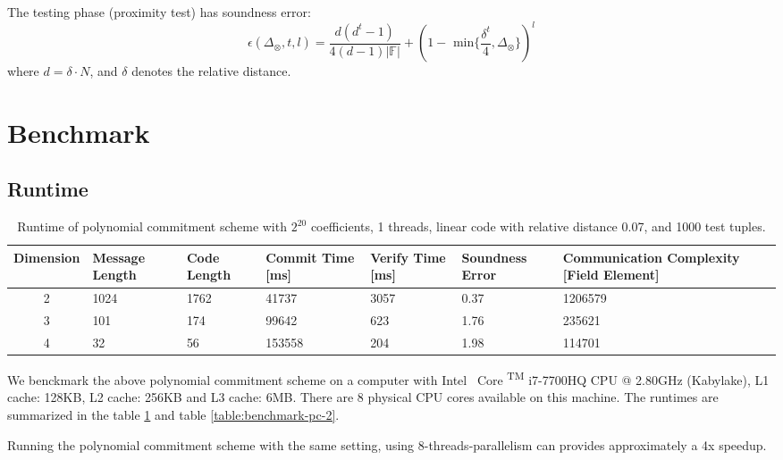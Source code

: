 \begin{lemma}
\label{lemma:pc-soundness}
The testing phase (proximity test) has soundness error:
$$
    \epsilon(\Delta_\otimes, t, l) = \frac{d(d^t-1)}{4(d-1)|\mathbb{F}|} + (1 - \text{ min}\{\frac{\delta^t}{4}, \Delta_\otimes \})^l
$$
where $d = \delta \cdot N$, and $\delta$ denotes the relative distance.
\end{lemma}






\section{Benchmark}

\subsection{Runtime}


\begin{table}[h!]
\centering
\begin{tabular}{| c | m{4em}  | m{3em}  | m{3.5em} | m{2.5em} | m{5em} | m{7em} |} 
 \hline
 Dimension & Message Length & Code Length & Commit Time [ms] & Verify Time [ms] & Soundness Error & Communication Complexity [Field Element] \\ [0.5ex] 
 \hline\hline
 2 & 1024   & 1762 & 41737  & 3057  & 0.37 & 1206579 \\
 \hline
 3 & 101    & 174 & 99642  & 623  & 1.76 & 235621  \\
 \hline
 4 & 32     & 56 & 153558  & 204  & 1.98 & 114701   \\
 \hline
\end{tabular}
\caption{Runtime of polynomial commitment scheme with $2^{20}$ coefficients, 1 threads, linear code with relative distance 0.07, and 1000 test tuples.}
\label{table:benchmark-pc-1}
\end{table}


We benckmark the above polynomial commitment scheme on a computer with
Intel \textregistered \, Core  \textsuperscript{TM} i7-7700HQ CPU @ 2.80GHz (Kabylake), L1 cache: 128KB, L2 cache: 256KB and L3 cache: 6MB. There are 8 physical CPU cores available on this machine. The runtimes are summarized in the table \ref{table:benchmark-pc-1} and table \ref{table:benchmark-pc-2}.


Running the polynomial commitment scheme with the same setting, using 8-threads-parallelism can provides approximately a 4x speedup.

